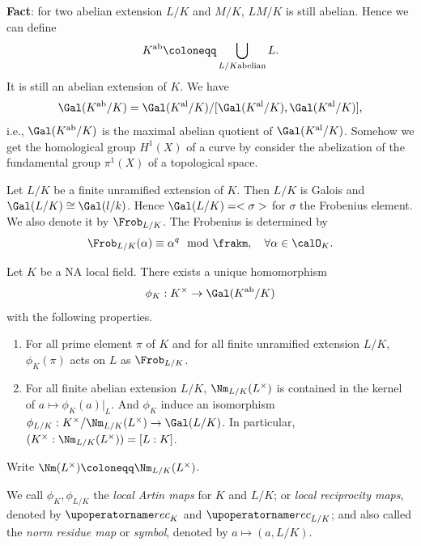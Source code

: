   \textbf{Fact}: for two abelian extension $L/K$ and $M/K$, $LM/K$ is still abelian.
  Hence we can define 
  \[ K^\ab \coloneqq \bigcup_{L/K \text{abelian}} L.\]
  It is still an abelian extension of $K$.
  We have 
  \[ \Gal(K^\ab /K) = \Gal(K^\al/K) / [\Gal(K^\al/K),\Gal(K^\al/K)], \]
  i.e., $\Gal(K^\ab/K)$ is the maximal abelian quotient of $\Gal(K^\al/K)$.
  Somehow we get the homological group $H^1(X)$ of a curve by consider the abelization of the fundamental group $\pi^1 (X)$ of a topological space.

  Let $L/K$ be a finite unramified extension of $K$.
  Then $L/K$ is Galois and $\Gal(L/K) \cong \Gal(l/k)$.
  Hence $\Gal(L/K) = <\sigma>$ for $\sigma$ the Frobenius element.
  We also denote it by $\Frob_{L/K}$.
  The Frobenius is determined by 
  \[ \Frob_{L/K}(\alpha) \equiv \alpha^q \mod \frakm, \quad \forall \alpha \in \calO_K. \]

  \begin{theorem}\label{thm:local_reciprocity_law}
      Let $K$ be a NA local field.
      There exists a unique homomorphism
      \[ \phi_K : K^\times \to \Gal(K^\ab/ K) \]
      with the following properties.
      \begin{enumerate}
          \item For all prime element $\pi$ of $K$ and for all finite unramified extension $L/K$, $\phi_K(\pi)$ acts on $L$ as $\Frob_{L/K}$.
          \item For all finite abelian extension $L/K$, $\Nm_{L/K}(L^\times)$ is contained in the kernel of $a \mapsto \phi_K(a)|_L$.
          And $\phi_K$ induce an isomorphism $\phi_{L/K}: K^\times/\Nm_{L/K}(L^\times) \to \Gal(L/K)$.
          In particular, $(K^\times : \Nm_{L/K}(L^\times)) = [L:K]$.
      \end{enumerate}
  \end{theorem}
  
  \begin{notation}
    Write $\Nm(L^\times) \coloneqq \Nm_{L/K}(L^\times)$.

    We call $\phi_K, \phi_{L / K}$ the \emph{local Artin maps} for $K$ and $L/K$;
    or \emph{local reciprocity maps}, denoted by $\rec_K$ and $\rec_{L/K}$; 
    and also called the \emph{norm residue map} or \emph{symbol}, denoted by $a \mapsto (a,L/K)$.
  \end{notation}

